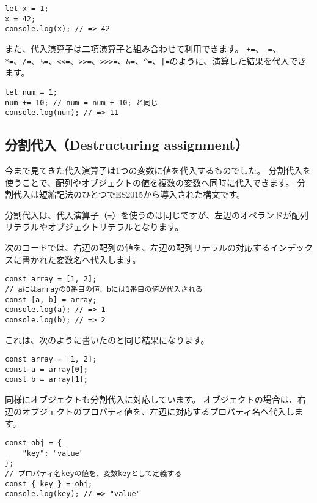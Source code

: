 \begin{lstlisting}
let x = 1;
x = 42;
console.log(x); // => 42
\end{lstlisting}

また、代入演算子は二項演算子と組み合わせて利用できます。
\lstinline{+=}、\lstinline{-=}、\lstinline{*=}、\lstinline{/=}、\lstinline{%=}、\lstinline{<<=}、\lstinline{>>=}、\lstinline{>>>=}、\lstinline{&=}、\lstinline{^=}、\lstinline{|=}のように、演算した結果を代入できます。

\begin{lstlisting}
let num = 1;
num += 10; // num = num + 10; と同じ
console.log(num); // => 11
\end{lstlisting}

\hypertarget{destructuring-assignment}{%
\subsection[分割代入（Destructuring
assignment）]{分割代入（Destructuring
assignment）\protect{}}\label{destructuring-assignment}}

今まで見てきた代入演算子は1つの変数に値を代入するものでした。
分割代入を使うことで、配列やオブジェクトの値を複数の変数へ同時に代入できます。
分割代入は短縮記法のひとつでES2015から導入された構文です。

分割代入は、代入演算子（\texttt{=}）を使うのは同じですが、左辺のオペランドが配列リテラルやオブジェクトリテラルとなります。

次のコードでは、右辺の配列の値を、左辺の配列リテラルの対応するインデックスに書かれた変数名へ代入します。

\begin{lstlisting}
const array = [1, 2];
// aにはarrayの0番目の値、bには1番目の値が代入される
const [a, b] = array;
console.log(a); // => 1
console.log(b); // => 2
\end{lstlisting}

これは、次のように書いたのと同じ結果になります。

\begin{lstlisting}
const array = [1, 2];
const a = array[0];
const b = array[1];
\end{lstlisting}

同様にオブジェクトも分割代入に対応しています。
オブジェクトの場合は、右辺のオブジェクトのプロパティ値を、左辺に対応するプロパティ名へ代入します。

\begin{lstlisting}
const obj = {
    "key": "value"
};
// プロパティ名keyの値を、変数keyとして定義する
const { key } = obj;
console.log(key); // => "value"
\end{lstlisting}

